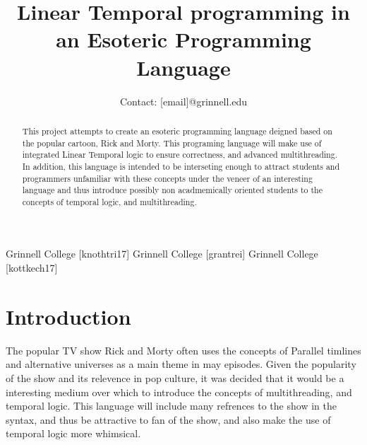 \documentclass[numbers]{sigplanconf}
\begin{document}
\setlength{\pdfpageheight}{\paperheight}
\setlength{\pdfpagewidth}{\paperwidth}



\titlebanner{}        %
\preprintfooter{}   %

\title{Linear Temporal programming in an Esoteric Programming Language}
\subtitle{Contact: [email]@grinnell.edu}


           {Grinnell College}
           {[knothtri17]}
           {Grinnell College}
           {[grantrei]}
           {Grinnell College}
           {[kottkech17]}

\makeatletter
\def\@copyrightspace{\relax}
\makeatother
%

\maketitle

\begin{abstract}
This project attempts to create an esoteric programming language
deigned based on the popular cartoon, Rick and Morty. This programing
language will make use of integrated Linear Temporal logic to ensure
correctness, and advanced multithreading. In addition, this language
is intended to be interseting enough to attract students and
programmers unfamiliar with these concepts under the veneer of an
interesting language and thus introduce possibly non acadmemically oriented students
 to the concepts of temporal logic, and multithreading.
\end{abstract}



\section{Introduction}
The popular TV show Rick and Morty often uses the concepts of
Parallel timlines and alternative universes as a main theme in may
episodes. Given the popularity of the show and its relevence in pop
culture, it was decided that it would be a interesting medium over
which to introduce the concepts of multithreading, and temporal logic.
This language will include many refrences to the show in the syntax,
and thus be attractive to fan of the show, and also make the use of
temporal logic more whimsical.
\end{document}
